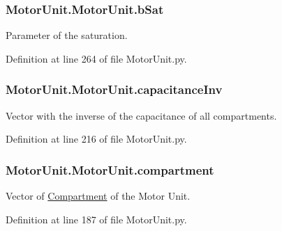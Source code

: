 \subsubsection[{\texorpdfstring{b\+Sat}{bSat}}]{\setlength{\rightskip}{0pt plus 5cm}Motor\+Unit.\+Motor\+Unit.\+b\+Sat}\hypertarget{class_motor_unit_1_1_motor_unit_a2256c241b36e0181e3530e6f791545a0}{}\label{class_motor_unit_1_1_motor_unit_a2256c241b36e0181e3530e6f791545a0}


Parameter of the saturation. 



Definition at line 264 of file Motor\+Unit.\+py.

\subsubsection[{\texorpdfstring{capacitance\+Inv}{capacitanceInv}}]{\setlength{\rightskip}{0pt plus 5cm}Motor\+Unit.\+Motor\+Unit.\+capacitance\+Inv}\hypertarget{class_motor_unit_1_1_motor_unit_a0cf2afb5bd12374db56b9d9a5a1671e6}{}\label{class_motor_unit_1_1_motor_unit_a0cf2afb5bd12374db56b9d9a5a1671e6}


Vector with the inverse of the capacitance of all compartments. 



Definition at line 216 of file Motor\+Unit.\+py.

\subsubsection[{\texorpdfstring{compartment}{compartment}}]{\setlength{\rightskip}{0pt plus 5cm}Motor\+Unit.\+Motor\+Unit.\+compartment}\hypertarget{class_motor_unit_1_1_motor_unit_a6d4da7327031b3cb9c7041a4a790e524}{}\label{class_motor_unit_1_1_motor_unit_a6d4da7327031b3cb9c7041a4a790e524}


Vector of \hyperlink{namespace_compartment}{Compartment} of the Motor Unit. 



Definition at line 187 of file Motor\+Unit.\+py.

